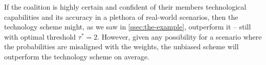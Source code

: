\begin{remark}
    If the coalition is highly certain and confident of their members technological capabilities and its accuracy in a plethora of real-world scenarios, then the technology scheme might, as we saw in \cref{ssec:the-example}, outperform it -- still with optimal threshold $\tau^* = 2$. However, given any possibility for a scenario where the probabilities are misaligned with the weights, the unbiased scheme will outperform the technology scheme on average. 
\end{remark}

 
